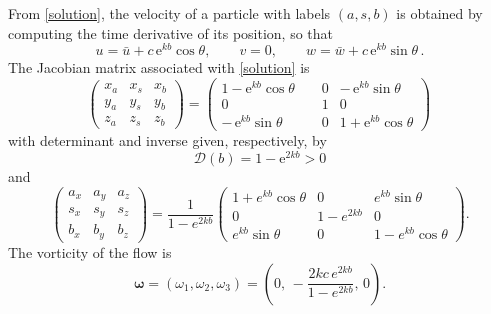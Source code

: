 \documentclass[reqno]{amsart}
\newcommand{\D}{\mathcal{D}}
\begin{document}
 \noindent 
 From \eqref{solution}, the velocity of a particle with labels  $(a,s,b)$ is obtained by computing the time derivative of its position, so that
        \begin{equation} \label{velocities} u =\bar{u} + c\,\mathrm{e}^{kb}\cos\theta,\qquad v=0,\qquad w=\bar{w} +c\,\mathrm{e}^{kb}\sin\theta \,. \end{equation}
      The Jacobian matrix associated with \eqref{solution} is  \begin{equation} \label{jacobian}\begin{pmatrix} x_a& x_s & x_b \\
     y_a & y_s& y_b \\ z_a & z_s & z_b \end{pmatrix} = \begin{pmatrix} 1-\mathrm{e}^{kb}\cos \theta  & 0& -\,\mathrm{e}^{kb}\sin \theta \\
        0 & 1 & 0\\-\,\mathrm{e}^{kb}\sin \theta \qquad &0& 1+\mathrm{e}^{kb}\cos \theta \end{pmatrix}\, \end{equation}
         with determinant and inverse given, respectively, by
                \begin{equation} \D(b)=1-\mathrm{e}^{2kb}>0
                 \end{equation}
                and
                 \begin{equation}\label{jacob}\begin{pmatrix}
a_x & a_y & a_z \\
s_x & s_y & s_z \\
b_x & b_y & b_z
\end{pmatrix}=\frac{1}{1-e^{2kb}}
\begin{pmatrix}
1+e^{kb}\cos\theta& 0 & e^{kb}\sin\theta\\
0 & 1-e^{2kb} & 0\\
e^{kb}\sin\theta & 0 & 1-e^{kb}\cos\theta
\end{pmatrix}.
\end{equation}
The vorticity of the flow is 
\begin{equation}\label{vorticity}
            \boldsymbol{\omega}=(\omega_1,\omega_2,\omega_3)=\left(0,\,-\dfrac{2kc\, e^{2kb}}{1 -e^{2kb}},\,0\right).
        \end{equation}
\end{document}
